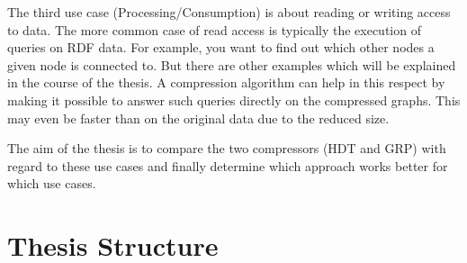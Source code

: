 The third use case (Processing/Consumption) is about reading or writing access to data. The more common case of read access is typically the execution of queries on RDF data. For example, you want to find out which other nodes a given node is connected to. But there are other examples which will be explained in the course of the thesis. A compression algorithm can help in this respect by making it possible to answer such queries directly on the compressed graphs. This may even be faster than on the original data due to the reduced size.

The aim of the thesis is to compare the two compressors (HDT and GRP) with regard to these use cases and finally determine which approach works better for which use cases.



\section{Thesis Structure}
